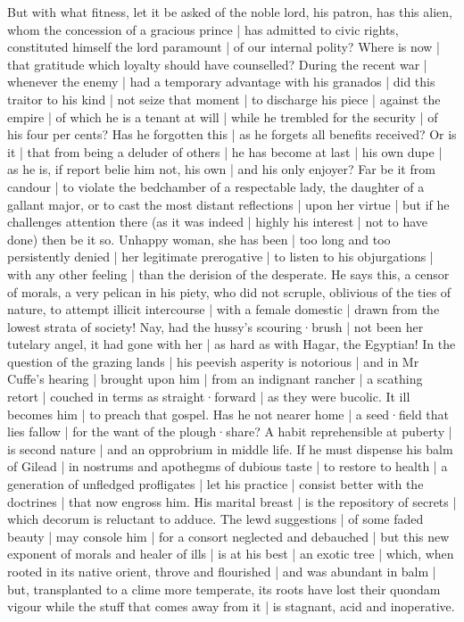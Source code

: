 But with what fitness,
let it be asked of the noble lord,
his patron,
has this alien,
whom the concession of a gracious prince |
has admitted to civic rights,
constituted himself the lord paramount |
of our internal polity?
Where is now |
that gratitude which loyalty should have counselled?
During the recent war |
whenever the enemy |
had a temporary advantage with his granados |
did this traitor to his kind |
not seize that moment |
to discharge his piece |
against the empire |
of which he is a tenant at will |
while he trembled for the security |
of his four per cents?
Has he forgotten this |
as he forgets all benefits received?
Or is it |
that from being a deluder of others |
he has become at last |
his own dupe |
as he is,
if report belie him not,
his own |
and his only enjoyer?
Far be it from candour |
to violate the bedchamber of a respectable lady,
the daughter of a gallant major,
or to cast the most distant reflections |
upon her virtue |
but if he challenges attention there
(as it was indeed |
highly his interest |
not to have done)
then be it so.
Unhappy woman,
she has been |
too long and too persistently denied |
her legitimate prerogative |
to listen to his objurgations |
with any other feeling |
than the derision of the desperate.
He says this,
a censor of morals,
a very pelican in his piety,
who did not scruple,
oblivious of the ties of nature,
to attempt illicit intercourse |
with a female domestic |
drawn from the lowest strata of society!
Nay,
had the hussy's scouring·brush |
not been her tutelary angel,
it had gone with her |
as hard as with Hagar,
the Egyptian!
In the question of the grazing lands |
his peevish asperity is notorious |
and in Mr Cuffe's hearing |
brought upon him |
from an indignant rancher |
a scathing retort |
couched in terms as straight·forward |
as they were bucolic.
It ill becomes him |
to preach that gospel.
Has he not nearer home |
a seed·field that lies fallow |
for the want of the plough·share?
A habit reprehensible at puberty |
is second nature |
and an opprobrium in middle life.
If he must dispense his balm of Gilead |
in nostrums and apothegms of dubious taste |
to restore to health |
a generation of unfledged profligates |
let his practice |
consist better with the doctrines |
that now engross him.
His marital breast |
is the repository of secrets |
which decorum is reluctant to adduce.
The lewd suggestions |
of some faded beauty |
may console him |
for a consort neglected and debauched |
but this new exponent of morals and healer of ills |
is at his best |
an exotic tree |
which,
when rooted in its native orient,
throve and flourished |
and was abundant in balm |
but,
transplanted to a clime more temperate,
its roots have lost their quondam vigour
while the stuff that comes away from it |
is stagnant,
acid and inoperative.


